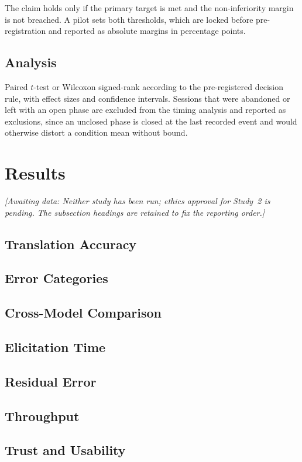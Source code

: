 \documentclass[acmsmall,screen,review,anonymous]{acmart}
\newcommand{\awaitingdata}[1]{%
  \par\noindent\textit{[Awaiting data: #1]}\par}
\begin{document}
The claim holds only if the primary target is met and the non-inferiority
margin is not breached. A pilot sets both thresholds, which are locked before
pre-registration and reported as absolute margins in percentage points.

\subsection{Analysis}

Paired $t$-test or Wilcoxon signed-rank according to the pre-registered
decision rule, with effect sizes and confidence intervals. Sessions that were
abandoned or left with an open phase are excluded from the timing analysis and
reported as exclusions, since an unclosed phase is closed at the last recorded
event and would otherwise distort a condition mean without bound.

\section{Results}
\label{sec:results}
\awaitingdata{Neither study has been run; ethics approval for Study~2 is
pending. The subsection headings are retained to fix the reporting order.}

\subsection{Translation Accuracy}
\subsection{Error Categories}
\subsection{Cross-Model Comparison}
\subsection{Elicitation Time}
\subsection{Residual Error}
\subsection{Throughput}
\subsection{Trust and Usability}
\end{document}
